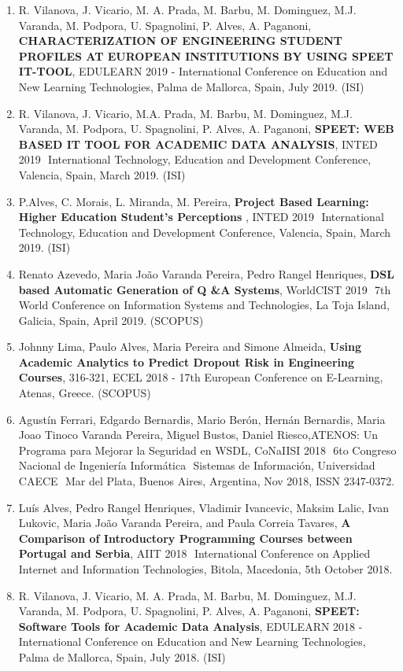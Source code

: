 \documentclass[11pt]{article}
\begin{document}
\begin{enumerate}
\item{R. Vilanova, J. Vicario, M. A. Prada, M. Barbu, M. Dominguez, M.J. Varanda, M. Podpora, U. Spagnolini, P. Alves, A. Paganoni, {
\bf{ CHARACTERIZATION OF ENGINEERING STUDENT PROFILES AT EUROPEAN INSTITUTIONS BY USING SPEET IT-TOOL}}, EDULEARN 2019 - International Conference on Education and New Learning Technologies, Palma de Mallorca, Spain, July 2019. (ISI)}
\item{R. Vilanova, J. Vicario, M.A. Prada, M. Barbu, M. Dominguez, M.J. Varanda, M. Podpora, U. Spagnolini, P. Alves, A. Paganoni, {
\bf{ SPEET: WEB BASED IT TOOL FOR ACADEMIC DATA ANALYSIS}}, INTED 2019  International Technology, Education and Development Conference, Valencia, Spain, March 2019. (ISI)}
\item{P.Alves, C. Morais, L. Miranda, M. Pereira, {
\bf{ Project Based Learning: Higher Education Student's Perceptions}} , INTED 2019  International Technology, Education and Development Conference, Valencia, Spain, March 2019. (ISI)}
\item{Renato Azevedo, Maria João Varanda Pereira, Pedro Rangel Henriques, {
\bf{ DSL based Automatic Generation of Q
\&A Systems}},  WorldCIST 2019  7th World Conference on Information Systems and Technologies, La Toja Island, Galicia, Spain, April 2019. (SCOPUS)}
\item{Johnny Lima, Paulo Alves, Maria Pereira and Simone Almeida, {
\bf{ Using Academic Analytics to Predict Dropout Risk in Engineering Courses}},  316-321, ECEL 2018 - 17th European Conference on E-Learning, Atenas, Greece. (SCOPUS)}
\item{Agustín Ferrari, Edgardo Bernardis, Mario Berón, Hernán Bernardis, Maria Joao Tinoco Varanda Pereira, Miguel Bustos, Daniel Riesco,ATENOS: Un Programa para Mejorar la Seguridad en WSDL, CoNaIISI 2018  6to Congreso Nacional de Ingeniería Informática  Sistemas de Información, Universidad CAECE  Mar del Plata, Buenos Aires, Argentina, Nov 2018, ISSN 2347-0372.}
\item{Luís Alves, Pedro Rangel Henriques, Vladimir Ivancevic, Maksim Lalic, Ivan Lukovic, Maria João Varanda Pereira, and Paula Correia Tavares, {
\bf{ A Comparison of Introductory Programming Courses between Portugal and Serbia}}, AIIT 2018  International Conference on Applied Internet and Information Technologies, Bitola, Macedonia, 5th October 2018.}
\item{R. Vilanova, J. Vicario, M. A. Prada, M. Barbu, M. Dominguez, M.J. Varanda, M. Podpora, U. Spagnolini, P. Alves, A. Paganoni, {
\bf{ SPEET: Software Tools for Academic Data Analysis}}, EDULEARN 2018 - International Conference on Education and New Learning Technologies, Palma de Mallorca, Spain, July 2018. (ISI)}

\end{enumerate}
\end{document}
